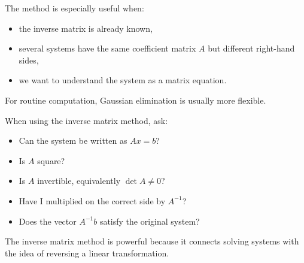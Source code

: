 The method is especially useful when:
\begin{itemize}
\item the inverse matrix is already known,
\item several systems have the same coefficient matrix \(A\) but different right-hand sides,
\item we want to understand the system as a matrix equation.
\end{itemize}

For routine computation, Gaussian elimination is usually more flexible.

\begin{summarybox}
When using the inverse matrix method, ask:
\begin{itemize}
\item Can the system be written as \(Ax=b\)?
\item Is \(A\) square?
\item Is \(A\) invertible, equivalently \(\det A\ne0\)?
\item Have I multiplied on the correct side by \(A^{-1}\)?
\item Does the vector \(A^{-1}b\) satisfy the original system?
\end{itemize}
\end{summarybox}

The inverse matrix method is powerful because it connects solving systems with the idea of reversing a linear transformation.
